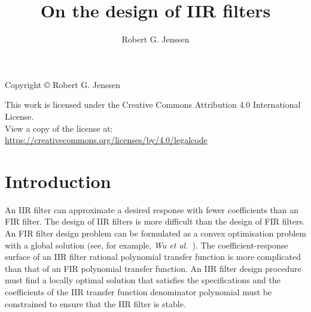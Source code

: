 \documentclass[a4paper,twoside,10pt,english]{report}
\title{On the design of IIR filters}
\author{Robert G. Jenssen}
\begin{document}
\begin{titlepage}
\maketitle
\end{titlepage}
\clearpage{}
\vspace*{22cm}
Copyright \copyright{} Robert G. Jenssen

This work is licensed under the Creative Commons Attribution 4.0 International
License.\\ View a copy of the license at:
\url{https://creativecommons.org/licenses/by/4.0/legalcode}
\cleardoublepage{}
\tableofcontents{}
\cleardoublepage{}
\chapter{Introduction}
An IIR filter can approximate a desired response with fewer coefficients than
an FIR filter. The design of IIR filters is more difficult than the design of
FIR filters. An FIR filter design problem can be formulated as a convex
optimisation problem with a global solution (see, for example, \emph{Wu et
  al.}~\cite{WuBoydVandenberghe_FIRFilterDesignSDP}). The coefficient-response
surface of an IIR filter rational polynomial transfer function is more
complicated than that of an FIR polynomial transfer function. An IIR filter
design procedure must find a locally optimal solution that satisfies the
specifications and the coefficients of the IIR transfer function denominator
polynomial must be constrained to ensure that the IIR filter is stable.
\end{document}
